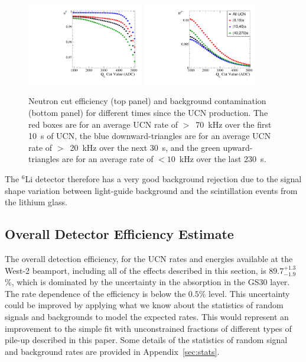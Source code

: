 \documentclass[twocolumn]{bmcart}
\begin{document}
\begin{figure}[!htpb]
\centering \includegraphics[width = 0.45\textwidth, angle=0]{figures/neutronEffLayered.pdf}
\centering \includegraphics[width = 0.45\textwidth, angle=0]{figures/backgroundContLayered.pdf}
\caption{ Neutron cut efficiency (top panel) and background
  contamination (bottom panel) for different times since the UCN
  production.  The red boxes are for an average UCN rate of $>$~70~kHz
  over the first 10~s of UCN, the blue downward-triangles are for an
  average UCN rate of $>$~20~kHz over the next 30~s, and the green
  upward-triangles are for an average rate of $<10$~kHz over the last
  230~s.}
\label{fig:detectionEffLayered}
\end{figure}

The $^6$Li detector therefore has a very good background rejection due
to the signal shape variation between light-guide background and the
scintillation events from the lithium glass.  

\subsection{Overall Detector Efficiency Estimate}

The overall detection efficiency, for the UCN rates and energies
available at the West-2 beamport, including all of the effects
described in this section, is $89.7^{+1.3}_{-1.9}$\%, which is
dominated by the uncertainty in the absorption in the GS30 layer. The
rate dependence of the efficiency is below the $0.5$\% level.  This
uncertainty could be improved by applying what we know about the
statistics of random signals and backgrounds to model the expected
rates.  This would represent an improvement to the simple fit with
unconstrained fractions of different types of pile-up described in
this paper.  Some details of the statistics of random signal and
background rates are provided in Appendix~\ref{sec:stats}.
\end{document}
